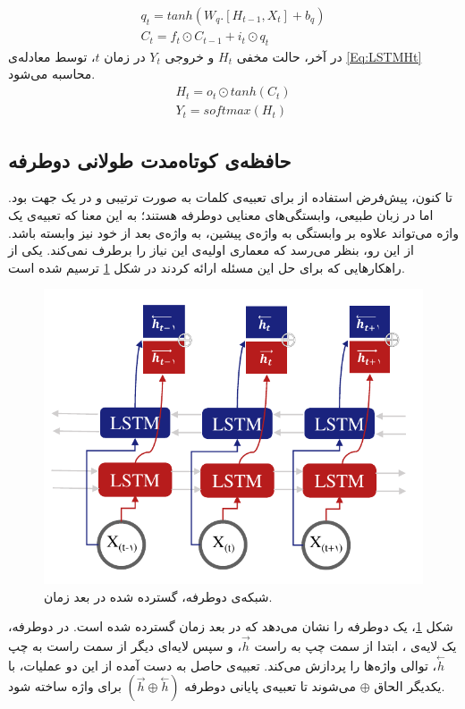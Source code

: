 \begin{equation}
	\begin{array}{l}
		q_{t} = tanh(W_{q}.[H_{t-1},X_{t}] + b_{q})\\
		C_{t} = f_{t} ⊙ C_{t-1} + i_{t} ⊙ q_{t}
	\end{array}
	\label{Eq:LSTMCt}
\end{equation}
در آخر، حالت مخفی $H_{t}$ و خروجی $Y_{t}$ در زمان $t$، توسط معادله‌ی \ref{Eq:LSTMHt} محاسبه می‌شود.
\begin{equation}
	\begin{array}{l}
		H_{t} = o_{t} ⊙ tanh(C_{t})\\
		Y_{t} = softmax(H_{t}) 
	\end{array}
	\label{Eq:LSTMHt}
\end{equation}
\subsection{حافظه‌ی کوتاه‌مدت طولانی دوطرفه}
تا کنون، پیش‌فرض استفاده از  برای تعبیه‌ی کلمات به صورت ترتیبی و در یک جهت بود. اما در زبان طبیعی، وابستگی‌های معنایی دوطرفه هستند؛ به این معنا که تعبیه‌ی یک واژه می‌تواند علاوه بر وابستگی به واژه‌ی پیشین، به واژه‌ی بعد از خود نیز وابسته باشد. از این رو، بنظر می‌رسد که معماری اولیه‌ی  این نیاز را برطرف نمی‌کند. یکی از راهکارهایی که برای حل این مسئله ارائه کردند در شکل \ref{Fig:BILSTM} ترسیم شده است.


 \begin{figure}[!htb]
	\centering
	\includegraphics[scale=0.7]{Figures/bilstmenrolled.pdf}
	\caption[شبکه‌ی  دوطرفه]{شبکه‌ی  دوطرفه، گسترده شده در بعد زمان.}
	\label{Fig:BILSTM}
\end{figure}
شکل \ref{Fig:BILSTM}، یک  دوطرفه را نشان می‌دهد که در بعد زمان گسترده شده است. در  دوطرفه، یک لایه‌ی ، ابتدا از سمت چپ به راست $\overset{\rightarrow}{h}$، و سپس لایه‌ای دیگر از سمت راست به چپ $\overset{\leftarrow}{h}$، توالی واژه‌ها را پردازش می‌کند. تعبیه‌ی حاصل به دست آمده از این دو عملیات، با یکدیگر الحاق $\oplus$ می‌شوند تا تعبیه‌ی پایانی دوطرفه $(\overset{\rightarrow}{h}\oplus \overset{\leftarrow}{h})$ برای واژه ساخته شود.
